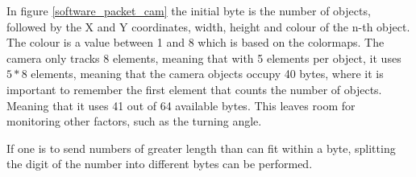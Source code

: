 In figure \ref{software_packet_cam} the initial byte is the number of objects, followed by the X and Y coordinates, width, height and colour of the n-th object. The colour is a value between 1 and 8 which is based on the colormaps. 
The camera only tracks 8 elements, meaning that with 5 elements per object, it uses $5 * 8$ elements, meaning that the camera objects occupy 40 bytes, where it is important to remember the first element that counts the number of objects. Meaning that it uses 41 out of 64 available bytes.
This leaves room for monitoring other factors, such as the turning angle.

If one is to send numbers of greater length than can fit within a byte, splitting the digit of the number into different bytes can be performed.
